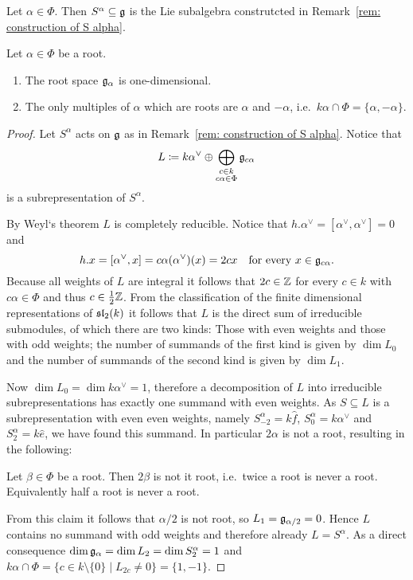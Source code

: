 \begin{definition}
 Let $\alpha \in \Phi$. Then $S^\alpha \subseteq \mathfrak{g}$ is the Lie subalgebra construtcted in Remark~\ref{rem: construction of S alpha}.
\end{definition}


\begin{proposition}
 Let $\alpha \in \Phi$ be a root.
 \begin{enumerate}[leftmargin=*]
  \item
   The root space $\mathfrak{g}_\alpha$ is one-dimensional.
  \item
   The only multiples of $\alpha$ which are roots are $\alpha$ and $-\alpha$, i.e.\ $k\alpha \cap \Phi = \{\alpha, -\alpha\}$.
 \end{enumerate}
\end{proposition}
\begin{proof}
 Let $S^\alpha$ acts on $\mathfrak{g}$ as in Remark~\ref{rem: construction of S alpha}. Notice that
 \[
  L \coloneqq k \alpha^\vee \oplus \bigoplus_{\substack{c \in k \\ c\alpha \in \Phi}} \mathfrak{g}_{c\alpha}
 \]
 is a subrepresentation of $S^\alpha$.
 
 By Weyl‘s theorem $L$ is completely reducible. Notice that $h.\alpha^\vee = [\alpha^\vee, \alpha^\vee] = 0$ and
 \[
  h.x = [\alpha^\vee, x] = c\alpha(\alpha^\vee)(x) = 2cx
  \quad \text{for every $x \in \mathfrak{g}_{c\alpha}$}.
 \]
 Because all weights of $L$ are integral it follows that $2c \in \mathbb{Z}$ for every $c \in k$ with $c\alpha \in \Phi$ and thus $c \in \frac{1}{2}\mathbb{Z}$. From the classification of the finite dimensional representations of $\mathfrak{sl}_2(k)$ it follows that $L$ is the direct sum of irreducible submodules, of which there are two kinds: Those with even weights and those with odd weights; the number of summands of the first kind is given by $\dim L_0$ and the number of summands of the second kind is given by $\dim L_1$.
 
 Now $\dim L_0 = \dim k\alpha^\vee = 1$, therefore a decomposition of $L$ into irreducible subrepresentations has exactly one summand with even weights. As $S \subseteq L$ is a subrepresentation with even even weights, namely $S^\alpha_{-2} = k\hat{f}$, $S^\alpha_0 = k\alpha^\vee$ and $S^\alpha_2 = k\hat{e}$, we have found this summand. In particular $2\alpha$ is not a root, resulting in the following:
 
 \begin{claim*}
  Let $\beta \in \Phi$ be a root. Then $2\beta$ is not it root, i.e.\ twice a root is never a root. Equivalently half a root is never a root.
 \end{claim*}
 
 From this claim it follows that $\alpha/2$ is not root, so $L_1 = \mathfrak{g}_{\alpha/2} = 0$. Hence $L$ contains no summand with odd weights and therefore already $L = S^\alpha$. As a direct consequence $\dim \mathfrak{g}_\alpha = \dim L_2 = \dim S^\alpha_2 = 1$ and $k\alpha \cap \Phi = \{c \in k \setminus \{0\} \mid L_{2c} \neq 0\} = \{1,-1\}$.
\end{proof}



